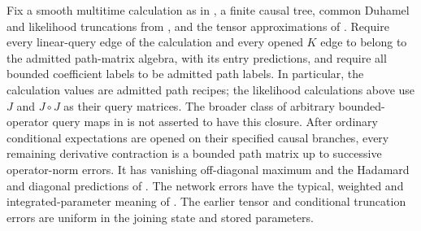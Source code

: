 \begin{proposition}
\label{prop:path-opened-derivative}
Fix a smooth multitime calculation as in
, a finite causal tree, common
Duhamel and likelihood truncations from
, and the tensor
approximations of .
Require every linear-query edge of the calculation and every opened
$K$ edge to belong to the admitted path-matrix algebra, with its
entry predictions, and require all bounded coefficient labels to be
admitted path labels.  In particular, the calculation values are
admitted path recipes; the likelihood calculations above use $J$
and $J\circ J$ as their query matrices.  The broader class of
arbitrary bounded-operator query maps in
 is not asserted to have this closure.
After ordinary conditional expectations are opened on their specified
causal branches, every remaining derivative contraction is a bounded
path matrix up to successive operator-norm errors.  It has vanishing
off-diagonal maximum and the Hadamard and diagonal predictions of
.  The network errors have the typical,
weighted and integrated-parameter meaning of .
The earlier tensor and conditional truncation errors are uniform in
the joining state and stored parameters.
\end{proposition}

